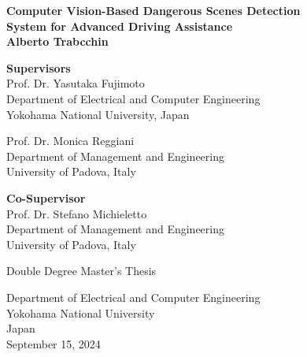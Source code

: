 \begin{titlepage}
\begin{center}

\vspace*{0.5cm}
\textbf{\Large{Computer Vision-Based Dangerous Scenes Detection}\\ 
        \vspace*{0.2cm}
        \Large{System for Advanced Driving Assistance}}\\
\vspace*{2cm}
\textbf{\large{Alberto Trabcchin}}\\
\vfill

\vspace*{1cm}

\begin{flushright}
\textbf{Supervisors} \\
\vspace*{0.5cm}
Prof. Dr. Yasutaka Fujimoto \\
Department of Electrical and Computer Engineering \\
Yokohama National University, Japan

\vspace*{0.5cm}

Prof. Dr. Monica Reggiani \\
Department of Management and Engineering \\
University of Padova, Italy

\vspace*{1cm}

\textbf{Co-Supervisor} \\
\vspace*{0.5cm}
Prof. Dr. Stefano Michieletto \\
Department of Management and Engineering \\
University of Padova, Italy
\end{flushright}

\vfill

Double Degree Master's Thesis\\
    
\vspace{0.8cm}

    
Department of Electrical and Computer Engineering\\
Yokohama National University\\
Japan\\
September 15, 2024
            
\end{center}
\end{titlepage}

\afterpage{\blankpage}
